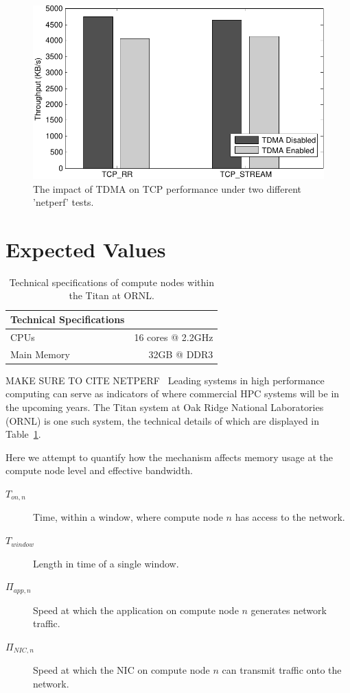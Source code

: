 \documentclass[oneside,12pt]{memoir}
\begin{document}
\begin{figure}
\centering
\includegraphics[scale=0.75]{detailed_performance.pdf}
\caption{The impact of TDMA on TCP performance under two different 'netperf' tests.}
\label{fig:detailed_performance}
\end{figure}

\section{Expected Values}

\begin{table}
	\begin{center}
	    \begin{tabular}{  l | r  }
	    Technical Specifications & \\ \hline
	    CPUs & 16 cores @ 2.2GHz \\
	    Main Memory & 32GB @ DDR3\\
	    \end{tabular}
	\end{center}
	\caption{Technical specifications of compute nodes within the Titan at ORNL.}
	\label{tab:titan_ORNL}
\end{table}
MAKE SURE TO CITE NETPERF~\cite{netperf}
Leading systems in high performance computing can serve as indicators of where commercial HPC systems will be in the upcoming years. The Titan system at Oak Ridge National Laboratories (ORNL) is one such system, the technical details of which are displayed in Table~\ref{tab:titan_ORNL}.

Here we attempt to quantify how the mechanism affects memory usage at the compute node level and effective bandwidth.
\begin{description}
    \item[$T_{on, n}$] Time, within a window, where compute node $n$ has access to the network.
    \item[$T_{window}$] Length in time of a single window.
    \item[$\Pi_{app, n}$] Speed at which the application on compute node $n$ generates network traffic.
    \item[$\Pi_{NIC, n}$] Speed at which the NIC on compute node $n$ can transmit traffic onto the network.
\end{description} 
\end{document}
